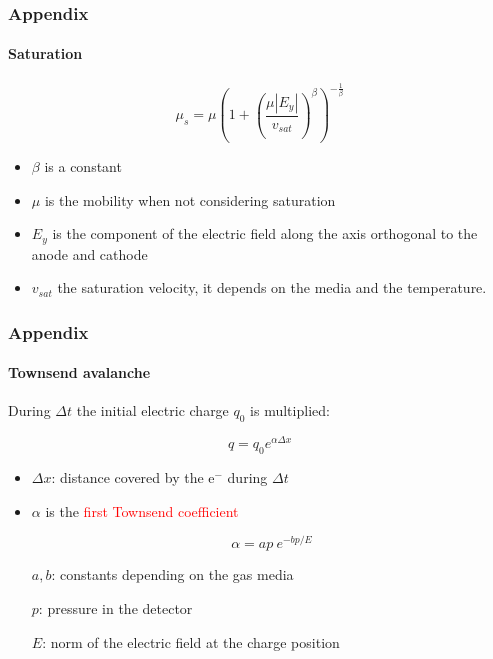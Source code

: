 \documentclass[14pt]{beamer}
\begin{document}
\begin{frame}
  \frametitle{Appendix}
  \framesubtitle{Saturation}

  \begin{equation}
		\mu_s = \mu \left (1 + \left (\frac{\mu |E_y|}{v_{sat}} \right )^{\beta} \right )^{-\frac{1}{\beta}}
		\label{eq:saturation}
	\end{equation}

\begin{itemize}
  \item $\beta$ is a constant
  \item $\mu$ is the mobility when not considering saturation
  \item $E_y$ is the component of the electric field along the axis orthogonal
  to the anode and cathode
  \item $v_{sat}$ the saturation velocity, it depends on the media and the
  temperature.
\end{itemize}

\end{frame}

\begin{frame}
  \frametitle{Appendix}
  \framesubtitle{Townsend avalanche}

  During $\Delta t$ the initial electric charge $q_0$ is multiplied:

  \begin{equation}
    q = q_0 e^{\alpha \Delta x}
    \label{eq:townsend}
  \end{equation}

\begin{itemize}
  \item $\Delta x$: distance covered by the e$^-$ during $\Delta t$
  \item $\alpha$ is the \textcolor{red}{first Townsend coefficient}

  \[\alpha = ap \ e^{-bp/E}\]

  $a, b$: constants depending on the gas media

  $p$: pressure in the detector

  $E$: norm of the electric field at the charge position
\end{itemize}

\end{frame}
\end{document}
